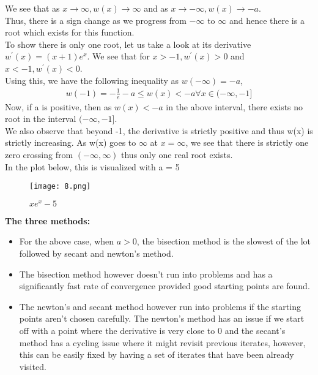 \documentclass[letterpaper]{exam}
\begin{document}
\begin{questions}
\begin{solution}
We see that as $x \rightarrow \infty, w(x) \rightarrow \infty$ and as $x \rightarrow -\infty, w(x) \rightarrow -a$.\\
Thus, there is a sign change as we progress from $-\infty$ to $\infty$ and hence there is a root which exists for this function. \\
To show there is only one root, let us take a look at its derivative
$w^{'}(x) = (x+1)e^x$. We see that for $x > -1, w^{'}(x) > 0$ and $x <-1, w^{'}(x) < 0$.\\
Using this, we have the following inequality as $w(-\infty) = -a$,
\begin{align*}
    w(-1) = -\frac{1}{e} - a \leq w(x) < -a \forall x \in (-\infty,-1] 
\end{align*}
Now, if a is positive, then as $w(x) <-a$ in the above interval, there exists no root in the interval $(-\infty,-1]$.\\
We also observe that beyond -1, the derivative is strictly positive and thus w(x) is strictly increasing. As w(x) goes to $\infty$ at $x = \infty$, we see that there is strictly one zero crossing from $(-\infty,\infty)$ thus only one real root exists.\\
In the plot below, this is visualized with a = 5
\begin{figure}[H]  
     \centering
    \texttt{[image: 8.png]}
     \label{fig:Dendrogram for the problem 3(c)}
     \caption{$xe^x - 5$}
\end{figure}
\textbf{The three methods:}\\
\begin{itemize}
    \item For the above case, when $a>0$, the bisection method is the slowest of the lot followed by secant and newton's method.
    \item The bisection method however doesn't run into problems and has a significantly fast rate of convergence provided good starting points are found.
    \item The newton's and secant method however run into problems if the starting points aren't chosen carefully. The newton's method has an issue if we start off with a point where the derivative is very close to 0 and the secant's method has a cycling issue where it might revisit previous iterates, however, this can be easily fixed by having a set of iterates that have been already visited.

\end{itemize}
\end{solution}
\end{questions}
\end{document}
